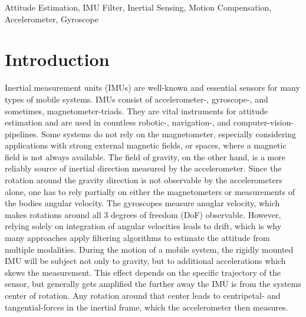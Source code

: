 \documentclass[journal]{IEEEtran}
\begin{document}
\begin{IEEEkeywords}
  Attitude Estimation, IMU Filter, Inertial Sensing, Motion Compensation, Accelerometer, Gyroscope
\end{IEEEkeywords}

\section{Introduction}

Inertial measurement units (IMUs) are well-known and essential sensors for many types of mobile systems.
IMUs consist of accelerometer-, gyroscope-, and sometimes, magnetometer-triads.
They are vital instruments for attitude estimation and are used in countless robotic-, navigation-, and computer-vision-pipelines.
Some systems do not rely on the magnetometer, especially considering applications with strong external magnetic fields, or spaces, where a magnetic field is not always available.
The field of gravity, on the other hand, is a more reliably source of inertial direction measured by the accelerometer.
Since the rotation around the gravity direction is not observable by the accelerometers alone, one has to rely partially on either the magnetometers or measurements of the bodies angular velocity.
The gyroscopes measure anuglar velocity, which makes rotations around all 3 degrees of freedom (DoF) observable.
However, relying solely on integration of angular velocities leads to drift, which is why many approaches apply filtering algorithms to estimate the attitude from multiple modalities.    
During the motion of a mobile system, the rigidly mounted IMU will be subject not only to gravity, but to additional accelerations which skews the measurement.
This effect depends on the specific trajectory of the sensor, but generally gets amplified the further away the IMU is from the systems center of rotation.
Any rotation around that center leads to centripetal- and tangential-forces in the inertial frame, which the accelerometer then measures.
\end{document}
